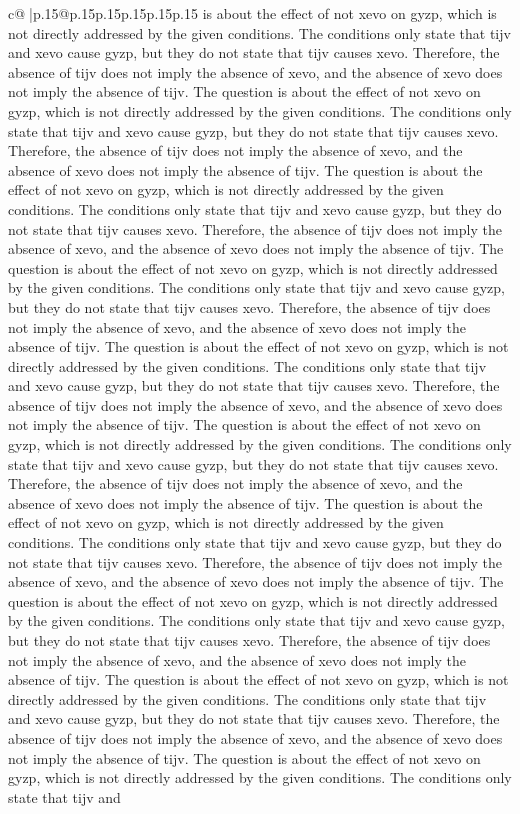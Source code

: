\documentclass{article}
\begin{document}
{\begin{supertabular}{c@{$\;$}|p{.15\linewidth}@{}p{.15\linewidth}p{.15\linewidth}p{.15\linewidth}p{.15\linewidth}p{.15\linewidth}}
{{{is about the effect of not xevo on gyzp, which is not directly addressed by the given conditions. The conditions only state that tijv and xevo cause gyzp, but they do not state that tijv causes xevo. Therefore, the absence of tijv does not imply the absence of xevo, and the absence of xevo does not imply the absence of tijv. The question is about the effect of not xevo on gyzp, which is not directly addressed by the given conditions. The conditions only state that tijv and xevo cause gyzp, but they do not state that tijv causes xevo. Therefore, the absence of tijv does not imply the absence of xevo, and the absence of xevo does not imply the absence of tijv. The question is about the effect of not xevo on gyzp, which is not directly addressed by the given conditions. The conditions only state that tijv and xevo cause gyzp, but they do not state that tijv causes xevo. Therefore, the absence of tijv does not imply the absence of xevo, and the absence of xevo does not imply the absence of tijv. The question is about the effect of not xevo on gyzp, which is not directly addressed by the given conditions. The conditions only state that tijv and xevo cause gyzp, but they do not state that tijv causes xevo. Therefore, the absence of tijv does not imply the absence of xevo, and the absence of xevo does not imply the absence of tijv. The question is about the effect of not xevo on gyzp, which is not directly addressed by the given conditions. The conditions only state that tijv and xevo cause gyzp, but they do not state that tijv causes xevo. Therefore, the absence of tijv does not imply the absence of xevo, and the absence of xevo does not imply the absence of tijv. The question is about the effect of not xevo on gyzp, which is not directly addressed by the given conditions. The conditions only state that tijv and xevo cause gyzp, but they do not state that tijv causes xevo. Therefore, the absence of tijv does not imply the absence of xevo, and the absence of xevo does not imply the absence of tijv. The question is about the effect of not xevo on gyzp, which is not directly addressed by the given conditions. The conditions only state that tijv and xevo cause gyzp, but they do not state that tijv causes xevo. Therefore, the absence of tijv does not imply the absence of xevo, and the absence of xevo does not imply the absence of tijv. The question is about the effect of not xevo on gyzp, which is not directly addressed by the given conditions. The conditions only state that tijv and xevo cause gyzp, but they do not state that tijv causes xevo. Therefore, the absence of tijv does not imply the absence of xevo, and the absence of xevo does not imply the absence of tijv. The question is about the effect of not xevo on gyzp, which is not directly addressed by the given conditions. The conditions only state that tijv and xevo cause gyzp, but they do not state that tijv causes xevo. Therefore, the absence of tijv does not imply the absence of xevo, and the absence of xevo does not imply the absence of tijv. The question is about the effect of not xevo on gyzp, which is not directly addressed by the given conditions. The conditions only state that tijv and }}}
\end{supertabular}}
\end{document}
